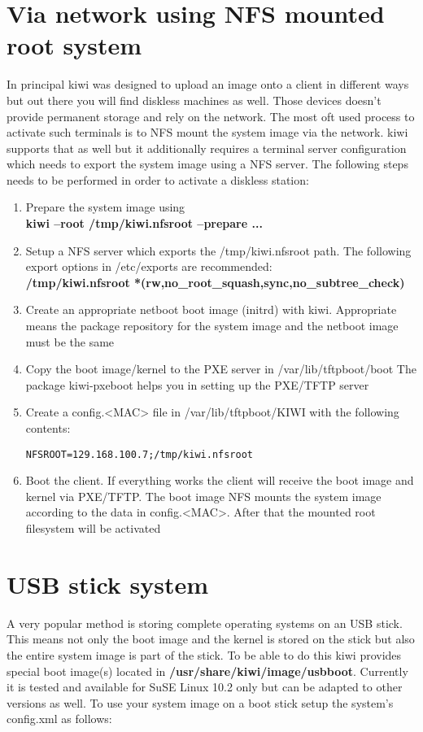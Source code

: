 \section{Via network using NFS mounted root system}
In principal kiwi was designed to upload an image onto a client in different
ways but out there you will find diskless machines as well. Those devices
doesn't provide permanent storage and rely on the network. The most oft used
process to activate such terminals is to NFS mount the system image via
the network. kiwi supports that as well but it additionally requires a
terminal server configuration which needs to export the system image using
a NFS server. The following steps needs to be performed in order to activate
a diskless station:
\begin{enumerate}
\item Prepare the system image using\\
      \textbf{kiwi --root /tmp/kiwi.nfsroot --prepare ...}
\item Setup a NFS server which exports the /tmp/kiwi.nfsroot path. The
      following export options in /etc/exports are recommended:\\
      \textbf{/tmp/kiwi.nfsroot  *(rw,no\_root\_squash,sync,no\_subtree\_check)}
\item Create an appropriate netboot boot image (initrd) with kiwi. Appropriate
      means the package repository for the system image and the netboot image
	  must be the same
\item Copy the boot image/kernel to the PXE server in /var/lib/tftpboot/boot
      The package kiwi-pxeboot helps you in setting up the PXE/TFTP server
\item Create a config.<MAC> file in /var/lib/tftpboot/KIWI with the following
      contents:
\begin{verbatim}
NFSROOT=129.168.100.7;/tmp/kiwi.nfsroot
\end{verbatim} 
\item Boot the client. If everything works the client will receive the boot
      image and kernel via PXE/TFTP. The boot image NFS mounts the system image
      according to the data in config.<MAC>. After that the mounted root filesystem
      will be activated  
\end{enumerate}

\section{USB stick system}
A very popular method is storing complete operating systems on an USB
stick. This means not only the boot image and the kernel is stored on
the stick but also the entire system image is part of the stick.
To be able to do this kiwi provides special boot image(s) located in
\textbf{/usr/share/kiwi/image/usbboot}. Currently it is tested and available
for SuSE Linux 10.2 only but can be adapted to other versions as well.
To use your system image on a boot stick setup the system's config.xml
as follows:

